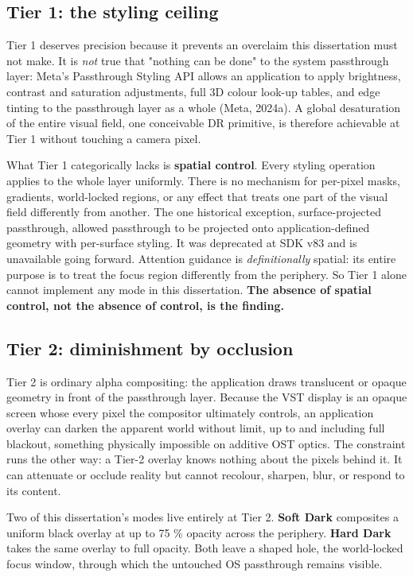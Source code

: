\subsection{Tier 1: the styling ceiling}

Tier 1 deserves precision because it prevents an overclaim this dissertation must not make. It is
\textit{not} true that "nothing can be done" to the system passthrough layer: Meta's Passthrough Styling API
allows an application to apply brightness, contrast and saturation adjustments, full 3D colour
look-up tables, and edge tinting to the passthrough layer as a whole (Meta, 2024a). A global
desaturation of the entire visual field, one conceivable DR primitive, is therefore achievable at
Tier 1 without touching a camera pixel.

What Tier 1 categorically lacks is \textbf{spatial control}. Every styling operation applies to the whole
layer uniformly. There is no mechanism for per-pixel masks, gradients, world-locked regions, or any
effect that treats one part of the visual field differently from another. The one historical
exception, surface-projected passthrough, allowed passthrough to be projected onto
application-defined geometry with per-surface styling. It was deprecated at SDK v83 and is unavailable
going forward. Attention guidance is \textit{definitionally} spatial: its entire purpose is to treat
the focus region differently from the periphery. So Tier 1 alone cannot implement any mode in this
dissertation. \textbf{The absence of spatial control, not the absence of control, is the finding.}

\subsection{Tier 2: diminishment by occlusion}

Tier 2 is ordinary alpha compositing: the application draws translucent or opaque geometry in front
of the passthrough layer. Because the VST display is an opaque screen whose every pixel the
compositor ultimately controls, an application overlay can darken the apparent world without limit,
up to and including full blackout, something physically impossible on additive OST optics. The
constraint runs the other way: a Tier-2 overlay knows nothing about the pixels behind it. It can
attenuate or occlude reality but cannot recolour, sharpen, blur, or respond to its content.

Two of this dissertation's modes live entirely at Tier 2. \textbf{Soft Dark} composites a uniform black
overlay at up to 75 \% opacity across the periphery. \textbf{Hard Dark} takes the same overlay to full
opacity. Both leave a shaped hole, the world-locked focus window, through which the untouched OS
passthrough remains visible.

